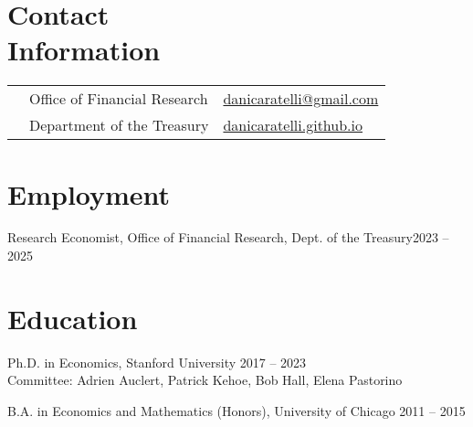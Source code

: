 \documentclass[margin,line]{res}                          %
\newenvironment{list1}{
	\begin{list}{\ding{113}}{%
			\setlength{\itemsep}{0in}
			\setlength{\parsep}{0in} \setlength{\parskip}{0in}
			\setlength{\topsep}{0in} \setlength{\partopsep}{0in}
			\setlength{\leftmargin}{0.17in}}}{\end{list}}
\begin{document}
	
	\begin{resume}
		\thispagestyle{plain} %
		
		\section{\sc Contact \\Information}
		\vspace{.05in}
		\begin{tabular}{@{}p{0.20in}p{2.75in}p{2.75in}}
			& Office of Financial Research      &\href{mailto:danicaratelli@gmail.com}{danicaratelli@gmail.com}
			\\    
			& Department of the Treasury  & \href{https://danicaratelli.github.io/}{danicaratelli.github.io}
		\end{tabular}
		
		\section{\sc Employment}
		\begin{list1}
			\item[] Research Economist, Office of Financial Research, Dept. of the Treasury\hfill 2023 -- 2025
		\end{list1}	
		
		\section{\sc Education}
		\begin{list1}
			\item[] Ph.D. in Economics, Stanford University \hfill 2017 -- 2023\\
			Committee: Adrien Auclert, Patrick Kehoe, Bob Hall, Elena Pastorino\smallskip
			\item[] B.A. in Economics and Mathematics (Honors), University of Chicago \hfill 2011 -- 2015
		\end{list1}
		

\end{resume}
\end{document}
